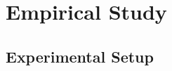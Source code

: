 \documentclass[10pt,twocolumn,letterpaper]{article}
\begin{document}

\section{Empirical Study}

\subsection{Experimental Setup}
\end{document}
